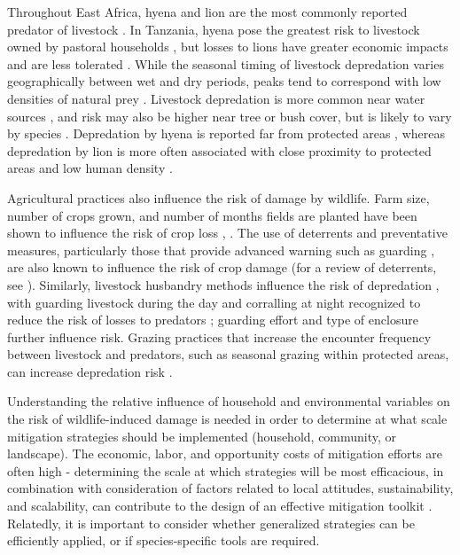 \documentclass[12pt,]{article}
\begin{document}
Throughout East Africa, hyena and lion are the most commonly reported predator of livestock \citep{Ogada2003, Patterson2004, Mkonyi2017, Kolowski2006, Koziarski2016}. In Tanzania, hyena pose the greatest risk to livestock owned by pastoral households \citep{Kissui2019, Holmern2007}, but losses to lions have greater economic impacts and are less tolerated \citep{Muriuki2017, Kissui2019, Kolowski2006, Lichtenfeld2015}. While the seasonal timing of livestock depredation varies geographically between wet \citep{Patterson2004, Kissui2019, Kolowski2006, Mponzi2014} and dry \citep{Butler2000, Ikanda2005} periods, peaks tend to correspond with low densities of natural prey \citep{Patterson2004, Kolowski2006}. Livestock depredation is more common near water sources \citep{Abade2014,Beattie2020, Weise2019}, and risk may also be higher near tree or bush cover, but is likely to vary by species \citep{Abade2014}. Depredation by hyena is reported far from protected areas \citep{Holmern2007}, whereas depredation by lion is more often associated with close proximity to protected areas \citep{Loveridge2010,Mbise2018, Holmern2007} and low human density \citep{Weise2019}. 

Agricultural practices also influence the risk of damage by wildlife. Farm size, number of crops grown, and number of months fields are planted have been shown to influence the risk of crop loss \citep{Sitati2003, Graham2010PatternsConflict, Karanth2012,  Karanth2013,Sitati2005FactorsConflict}, %
\textbf{\citep{Sitati2005FactorsConflict}}. The use of deterrents and preventative measures, particularly those that provide advanced warning such as guarding \citep{Sitati2005FactorsConflict}, are also known to influence the risk of crop damage (for a review of deterrents, see \cite{DenningerSnyder2020}). Similarly, livestock husbandry methods influence the risk of depredation \citep{Woodroffe2005,Inskip2009}, with guarding livestock during the day and corralling at night recognized to reduce the risk of losses to predators \citep{Ogada2003}%
; guarding effort \citep{Mkonyi2017} and type of enclosure \citep{Kissui2019, Lichtenfeld2015, Weise2018} further influence risk. Grazing practices that increase the encounter frequency between livestock and predators, such as seasonal grazing within protected areas, can increase depredation risk \citep{Valeix2012, Kuiper2015}.

Understanding the relative influence of household and environmental variables on the risk of wildlife-induced damage is needed in order to determine at what scale mitigation strategies should be implemented (household, community, or landscape). The economic, labor, and opportunity costs of mitigation efforts are often high  - determining the scale at which strategies will be most efficacious, in combination with consideration of factors related to local attitudes, sustainability, and scalability, can contribute to the design of an effective mitigation toolkit \citep{DenningerSnyder2020}. Relatedly, it is important to consider whether generalized strategies can be efficiently applied, or if species-specific tools are required. 
\end{document}
